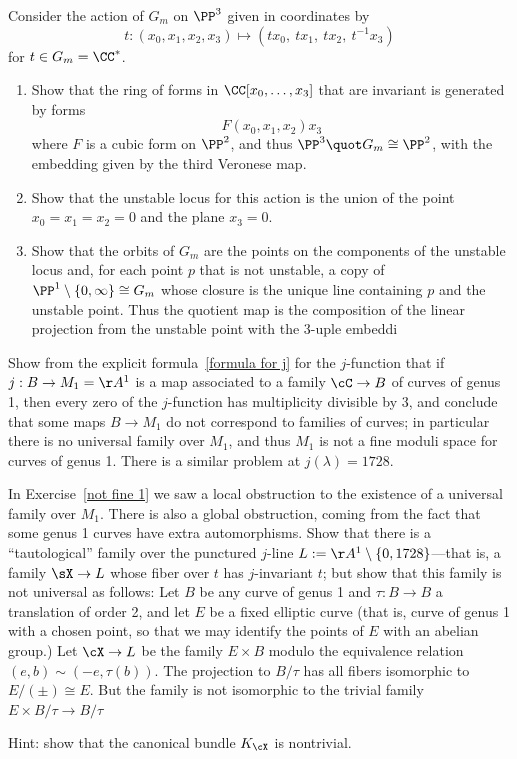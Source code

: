 \begin{exercise}
Consider the action of $G_m$ on $\PP^3$ given in coordinates by 
$$t: (x_0,x_1,x_2,x_3) \mapsto (tx_0,\ tx_1,\ tx_2,\ t^{-1}x_3)
$$
for $t\in G_m = \CC^*$.
\begin{enumerate}
 \item Show that the ring  of forms in $\CC[x_0, \dots, x_3]$ that are invariant is generated by
 forms
$$
F(x_0,  x_1, x_2)x_3
$$
where $F$ is a cubic form on $\PP^2$, and thus 
$\PP^3\quot G_m\cong \PP^2$, with the embedding given by the third Veronese map.
\item Show that the unstable locus for this action is the union of the point  $x_0=x_1=x_2 = 0$ and
the plane $x_3=0$.
\item Show that the orbits of $G_m$ are the points on the components of the unstable locus and, for each
point $p$ that is not unstable, a copy of
$\PP^1\setminus \{0,\infty\}\cong G_m$ whose closure is the unique line containing $p$ and the unstable
point. Thus the quotient map is the composition of the linear projection from the unstable point with the 3-uple
embeddi
\end{enumerate}
\end{exercise}

\begin{exercise}\label{not fine 1}
Show from the explicit formula~\ref{formula for j} for the $j$-function that if $j : B \to M_1 = \AA^1$ is a map  associated to a family $\cC \to B$ of curves of genus 1, then every zero of the $j$-function has multiplicity divisible by 3, and conclude that some maps $B\to M_1$ do not correspond to families of curves; in particular there is no universal family over $M_1$, and thus $M_1$ is not a fine moduli space for curves
of genus 1. There is a similar problem at $j(\lambda)=1728$. 
\end{exercise}

\begin{exercise}\label{not fine 2}
In Exercise~\ref{not fine 1} we saw a local obstruction to the existence of a universal family over $M_1$. There is also a global obstruction, coming from the fact that some genus 1 curves have extra automorphisms. Show that there is a ``tautological'' family over the punctured $j$-line $L := \AA^1\setminus \{0,1728\}$---that is, a family
$\sX \to L$ whose fiber over $t$ has $j$-invariant $t$; but show that this family is not universal as follows:
Let $B$ be any curve of genus 1 and $\tau : B \to B$ a translation of order 2, and let $E$ be a fixed elliptic curve (that is, curve of genus 1 with a chosen point, so that we may identify the points of $E$ with an abelian group.)
Let $\cX\to L$ be the family $E\times B$ modulo the equivalence relation $(e,b) \sim (-e, \tau(b))$.
The projection to $B/\tau$ has all fibers isomorphic to $E/(\pm) \cong E$. But the family is not
isomorphic to the trivial family $E\times B/\tau \to B/\tau$ 

Hint: show that the canonical bundle $K_\cX$ is nontrivial.
\end{exercise}

